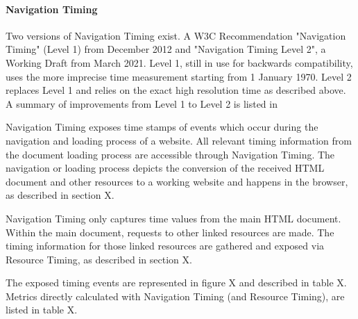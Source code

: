 \paragraph{Navigation Timing}



Two versions of Navigation Timing exist.
A W3C Recommendation "Navigation Timing" (Level 1) from December 2012 %
and "Navigation Timing Level 2", a Working Draft from March 2021. %
Level 1, still in use for backwards compatibility, uses the more imprecise time measurement starting from 1 January 1970.
Level 2 replaces Level 1 and relies on the exact high resolution time as described above.
A summary of improvements from Level 1 to Level 2 is listed in %





Navigation Timing exposes time stamps of events which occur during the navigation and loading process of a website.
All relevant timing information from the document loading process are accessible through Navigation Timing.
The navigation or loading process depicts the conversion of the received HTML document and other resources to a working website and happens in the browser, as described in section X. %

Navigation Timing only captures time values from the main HTML document.
Within the main document, requests to other linked resources are made.
The timing information for those linked resources are gathered and exposed via Resource Timing, as described in section X. %

The exposed timing events are represented in figure X and described in table X.
Metrics directly calculated with Navigation Timing (and Resource Timing), are listed in table X.


